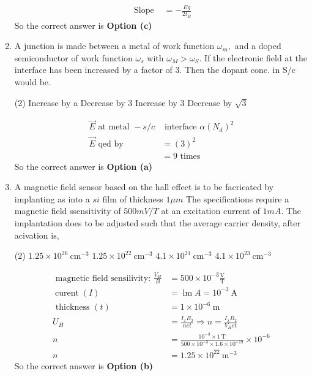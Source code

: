 \begin{enumerate}
\begin{answer}
\begin{align*}
	\text { Slope }&=-\frac{E g}{2 t_{B}}
	\end{align*}
	So the correct answer is \textbf{Option (c)}
\end{answer}
\item 
	A junction is made between a metal of work function $\omega_m ,$  and a doped semiconductor of work function $\omega_s$ with $\omega_{M}>\omega_{S} $. If the electronic field at the interface has been increased by a factor of $3$. Then the dopant conc. in S/c would be. 
	\begin{tasks}(2)
		\task[\textbf{a.}]Increase by a
		\task[\textbf{b.}]Decrease by 3
		\task[\textbf{c.}]Increase by 3
		\task[\textbf{d.}]Decrease by $\sqrt{3}$
	\end{tasks}
\begin{answer}
	\begin{align*}
	\vec{E} \text { at metal }-s/c &\text { interface } \alpha\left(N_{d}\right)^{2}\\
	\vec{E} \text { qed by } &=(3)^{2} \\
	&=9 \text { times }
	\end{align*}
	So the correct answer is \textbf{Option (a)}
\end{answer}
\item 
	A magnetic field sensor based on the hall effect is to be facricated by implanting as into a $si$ film of thickness $1\mu m$
	The specifications require a magnetic field ssensitivity of $500 mV/T$ at an excitation current of $1 mA$. The implantation does to be adjusted such that the average carrier density, after acivation is,
	\begin{tasks}(2)
		\task[\textbf{a.}] $1.25 \times 10^{26} \mathrm{~cm}^{-3}$
		\task[\textbf{b.}]$1.25 \times 10^{22} \mathrm{~cm}^{-3}$
		\task[\textbf{c.}]$4.1 \times 10^{21} \mathrm{~cm}^{-3}$
		\task[\textbf{d.}] $4.1 \times 10^{23} \mathrm{~cm}^{-3}$
	\end{tasks}
\begin{answer}
	\begin{align*}\text { magnetic field sensilivity: } \frac{V_{H}}{B}&=500 \times 10^{-3} \frac{\mathrm{V}}{\mathrm{T}}\\
	\operatorname{curent}(I)&=\operatorname{lm} A=10^{-3} \mathrm{~A}\\
	\text { thickness }(t)&=1 \times 10^{-6} \mathrm{~m}\\
	U_{H}&=\frac{I_{x} B_{2}}{n e t} \Rightarrow n=\frac{I_{x} B_{2}}{V_{H} e t}\\
	n&=\frac{10^{-3} \times 1 \mathrm{~T}}{500 \times 10^{-3} \times 1.6 \times 10^{-19}} \times 10^{-6} \\
	n&=1.25 \times 10^{22} \mathrm{~m}^{-3}
	\end{align*}
	So the correct answer is \textbf{Option (b)}
\end{answer}
\end{enumerate}